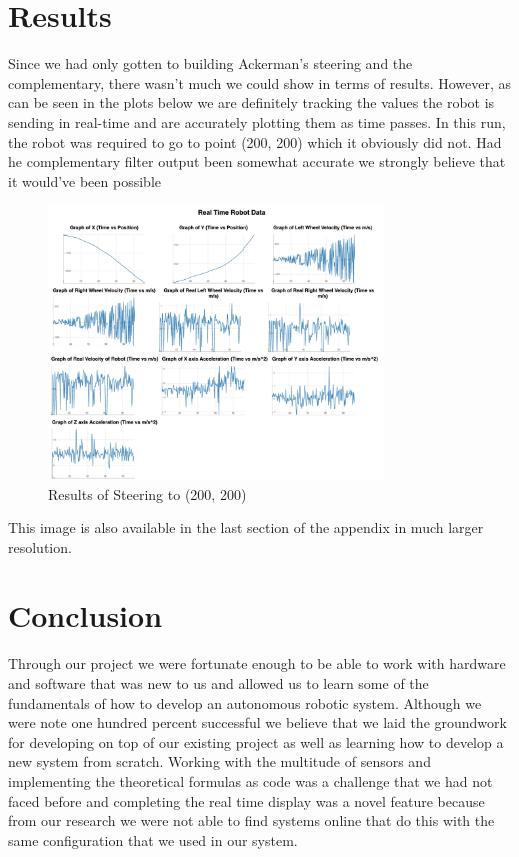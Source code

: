 \documentclass[conference]{IEEEtran}
\begin{document}
    \section{Results}

    Since we had only gotten to building Ackerman’s steering and the complementary,
    there wasn’t much we could show in terms of results. However, as can be seen in
    the plots below we are definitely tracking the values the robot is sending in
    real-time and are accurately plotting them as time passes. In this run, the
    robot was required to go to point (200, 200) which it obviously did not. Had 
    he complementary filter output been somewhat accurate we strongly believe that
    it would’ve been possible

    \begin{figure}[H]
        \centering
        \captionsetup{justification=centering}
        \centering
        \includegraphics[width=3.5in]{14.jpg}
        \caption{Results of Steering to (200, 200)}  
        \label{6}
    \end{figure}

    This image is also available in the last section of the appendix in much larger resolution.
    \section{Conclusion}

    Through our project we were fortunate enough to be able to work with hardware and software
    that was new to us and allowed us to learn some of the fundamentals of how to develop an
    autonomous robotic system. Although we were note one hundred percent successful we believe
    that we laid the groundwork for developing on top of our existing project as well
    as learning how to develop a new system from scratch. Working with the multitude of sensors
    and implementing the theoretical formulas as code was a challenge that we had not faced before
    and completing the real time display was a novel feature because from our research we were
    not able to find systems online that do this with the same configuration that we used in our
    system. 
\end{document}
